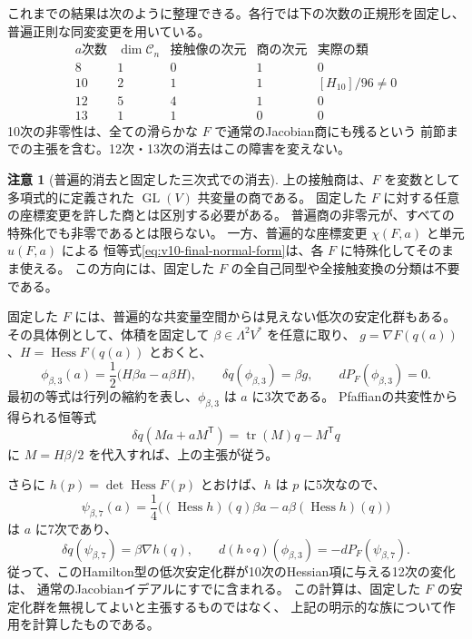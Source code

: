 \documentclass[a4paper,11pt]{ltjsarticle}
\theoremstyle{definition}
\newtheorem{remark}[theorem]{注意}
\begin{document}
これまでの結果は次のように整理できる。各行では下の次数の正規形を固定し、
普遍正則な同変変更を用いている。
\[
\begin{array}{c|c|c|c|c}
 a\text{次数}&\dim\mathcal C_n&\text{接触像の次元}&\text{商の次元}
                                      &\text{実際の類}\\\hline
 8&1&0&1&0\\
 10&2&1&1&[H_{10}]/96\ne0\\
 12&5&4&1&0\\
 13&1&1&0&0
\end{array}
\]
10次の非零性は、全ての滑らかな $F$ で通常のJacobian商にも残るという
前節までの主張を含む。12次・13次の消去はこの障害を変えない。


\begin{remark}[普遍的消去と固定した三次式での消去]
\label{rem:v10-universal-fixed-scope}
上の接触商は、$F$ を変数として多項式的に定義された
$\operatorname{GL}(V)$ 共変量の商である。
固定した $F$ に対する任意の座標変更を許した商とは区別する必要がある。
普遍商の非零元が、すべての特殊化でも非零であるとは限らない。
一方、普遍的な座標変更 $\chi(F,a)$ と単元 $u(F,a)$ による
恒等式\eqref{eq:v10-final-normal-form}は、各 $F$ に特殊化してそのまま使える。
この方向には、固定した $F$ の全自己同型や全接触変換の分類は不要である。

固定した $F$ には、普遍的な共変量空間からは見えない低次の安定化群もある。
その具体例として、体積を固定して $\beta\in\Lambda^2V^*$ を任意に取り、
$g=\nabla F(q(a))$、$H=\operatorname{Hess}F(q(a))$ とおくと、
\[
 \phi_{\beta,3}(a)=\frac12\bigl(H\beta a-a\beta H\bigr),
 \qquad \delta q(\phi_{\beta,3})=\beta g,
 \qquad dP_F(\phi_{\beta,3})=0.
\]
最初の等式は行列の縮約を表し、$\phi_{\beta,3}$ は $a$ に3次である。
Pfaffianの共変性から得られる恒等式
\[
 \delta q(Ma+aM^{\mathsf T})
    =\operatorname{tr}(M)q-M^{\mathsf T}q
\]
に $M=H\beta/2$ を代入すれば、上の主張が従う。

さらに $h(p)=\det\operatorname{Hess}F(p)$ とおけば、$h$ は $p$ に5次なので、
\[
 \psi_{\beta,7}(a)
   =\frac14\bigl((\operatorname{Hess}h)(q)\beta a
                       -a\beta(\operatorname{Hess}h)(q)\bigr)
\]
は $a$ に7次であり、
\[
 \delta q(\psi_{\beta,7})=\beta\nabla h(q),\qquad
 d(h\circ q)(\phi_{\beta,3})=-dP_F(\psi_{\beta,7}).
\]
従って、このHamilton型の低次安定化群が10次のHessian項に与える12次の変化は、
通常のJacobianイデアルにすでに含まれる。
この計算は、固定した $F$ の安定化群を無視してよいと主張するものではなく、
上記の明示的な族について作用を計算したものである。
\end{remark}
\end{document}
